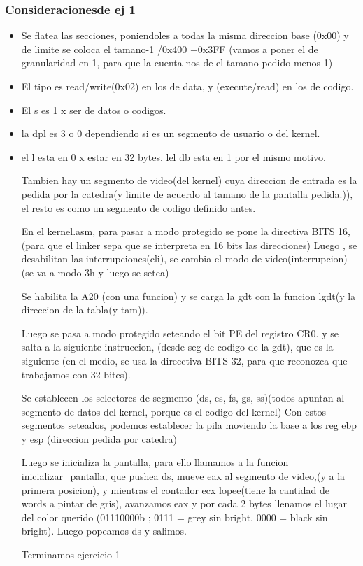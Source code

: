 \documentclass[a4paper]{article}
\begin{document}
\subsubsection{Consideracionesde ej 1}
\begin{itemize}


\item Se flatea las secciones, poniendoles a todas la misma direccion base (0x00) y de limite se coloca el tamano-1 /0x400 +0x3FF
(vamos a poner el de granularidad en 1, para que la cuenta nos de el tamano pedido menos 1)

\item El tipo es read/write(0x02) en los de data, y (execute/read) en los de codigo. 

\item El s es 1 x ser de datos o codigos.

\item la dpl es 3 o 0 dependiendo si es un segmento de usuario o del kernel.

\item el l esta en 0 x estar en 32 bytes. lel db esta en 1 por el mismo motivo. 


Tambien hay un segmento de video(del kernel) cuya direccion de entrada es la pedida por la catedra(y limite de acuerdo al tamano de la pantalla pedida.)), el resto es como un segmento de codigo definido antes.



En el kernel.asm, para pasar a modo protegido se pone la directiva BITS 16, (para que el linker sepa que se interpreta en 16 bits las direcciones)
Luego , se desabilitan las interrupciones(cli), se cambia el modo de video(interrupcion)(se va a modo 3h y luego   se setea) 

Se habilita la A20 (con una funcion) y se carga la gdt con la funcion lgdt(y la direccion de la tabla(y tam)).

Luego se pasa a modo protegido seteando el bit PE del registro CR0. y se salta a la siguiente instruccion, (desde seg de codigo de la gdt), que es la siguiente (en el medio, se usa la direcctiva BITS 32, para que reconozca que trabajamos con 32 bites).

Se establecen los selectores de segmento (ds, es, fs, gs, ss)(todos apuntan al segmento de datos del kernel, porque es el codigo del kernel)
Con estos segmentos seteados, podemos establecer la pila moviendo la base a los reg ebp y esp (direccion pedida por catedra)

 Luego se inicializa la pantalla, para ello llamamos a la funcion inicializar_pantalla, que pushea ds, mueve eax al segmento de video,(y a la primera posicion), y mientras el contador ecx lopee(tiene la cantidad de words a pintar de gris), avanzamos eax y por cada 2 bytes llenamos el lugar del color querido (01110000b ; 0111 = grey sin bright, 0000 = black sin bright). Luego popeamos ds y salimos.
  
 
   
Terminamos ejercicio 1
\end{itemize}
\newpage
\end{document}
